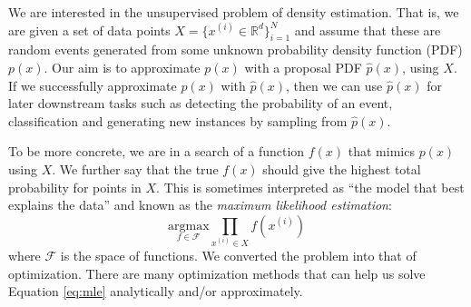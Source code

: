 \documentclass[a4paper,onesided,12pt]{report}
\begin{document}
We are interested in the unsupervised problem of density estimation. That is, we are given a set of data points $X = \{x^{(i)} \in \mathbb{R}^d\}_{i=1}^N$ and assume that these are random events generated from some unknown probability density function (PDF) $p(x)$. Our aim is to approximate $p(x)$ with a proposal PDF $\hat{p}(x)$, using $X$. If we successfully approximate $p(x)$ with $\hat{p}(x)$, then we can use $\hat{p}(x)$ for later downstream tasks such as detecting the probability of an event, classification and generating new instances by sampling from $\hat{p}(x)$.

To be more concrete, we are in a search of a function $f(x)$ that mimics $p(x)$ using $X$. We further say that the true $f(x)$ should give the highest total probability for points in $X$. This is sometimes interpreted as ``the model that best explains the data'' and known as the \emph{maximum likelihood estimation}:
\begin{equation}
\underset{f \in \mathcal{F}}{\text{argmax}} \prod_{x^{(i)} \in X} f(x^{(i)})
\label{eq:mle}
\end{equation}
where $\mathcal{F}$ is the space of functions. We converted the problem into that of optimization. There are many optimization methods that can help us solve Equation \ref{eq:mle} analytically and/or approximately.
\end{document}
